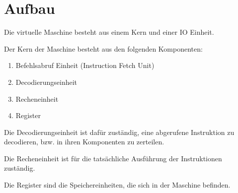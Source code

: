 \section{Aufbau}
\label{sec:Aufbau}
Die virtuelle Maschine besteht aus einem Kern und einer IO Einheit.

Der Kern der Maschine besteht aus den folgenden Komponenten:

\begin{enumerate}
  \item Befehlsabruf Einheit (Instruction Fetch Unit)
  \item Decodierungseinheit
  \item Recheneinheit
  \item Register
\end{enumerate}

Die Decodierungseinheit ist dafür zuständig, eine abgerufene Instruktion zu
decodieren, bzw. in ihren Komponenten zu zerteilen.

Die Recheneinheit ist für die tatsächliche Ausführung der Instruktionen
zuständig. 

Die Register sind die Speichereinheiten, die sich in der Maschine befinden.


